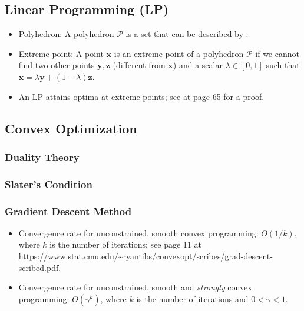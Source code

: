 

\subsection{Linear Programming (LP)}
    \begin{itemize}
        \item Polyhedron: A polyhedron $\mathcal{P}$ is a set that can be described by .
        \item Extreme point: A point $\bm{x}$ is an extreme point of a polyhedron $\mathcal{P}$ if we cannot find two other points $\bm{y}, \bm{z}$ (different from $\bm{x}$) and a scalar $\lambda \in [0, 1]$ such that $\bm{x} = \lambda \bm{y} + (1-\lambda) \bm{z}$.
        \item An LP attains optima at extreme points; see \cite{bertsimas1997introduction} at page 65 for a proof.
    \end{itemize}
    
    
    
\subsection{Convex Optimization}
    \subsubsection{Duality Theory}
    
    \subsubsection{Slater's Condition}
    
    \subsubsection{Gradient Descent Method}
    \begin{itemize}
        \item Convergence rate for unconstrained, smooth convex programming: $O(1/k)$, where $k$ is the number of iterations; see page 11 at \url{https://www.stat.cmu.edu/~ryantibs/convexopt/scribes/grad-descent-scribed.pdf}.
        \item Convergence rate for unconstrained, smooth and \emph{strongly} convex programming: $O(\gamma^k)$, where $k$ is the number of iterations and $0 < \gamma < 1$.
    \end{itemize}
    
